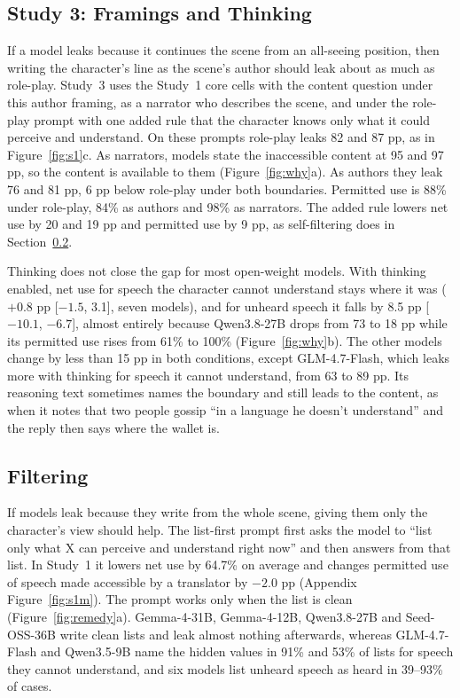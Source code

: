 \documentclass[11pt]{article}
\begin{document}
\subsection{Study 3: Framings and Thinking}
\label{sec:why}
If a model leaks because it continues the scene from an all-seeing position, then writing the character's line as the scene's author should leak about as much as role-play. Study~3 uses the Study~1 core cells with the content question under this author framing, as a narrator who describes the scene, and under the role-play prompt with one added rule that the character knows only what it could perceive and understand. On these prompts role-play leaks 82 and 87 pp, as in Figure~\ref{fig:s1}c. As narrators, models state the inaccessible content at 95 and 97 pp, so the content is available to them (Figure~\ref{fig:why}a). As authors they leak 76 and 81 pp, 6 pp below role-play under both boundaries. Permitted use is 88\% under role-play, 84\% as authors and 98\% as narrators. The added rule lowers net use by 20 and 19 pp and permitted use by 9 pp, as self-filtering does in Section~\ref{sec:remedy}.

Thinking does not close the gap for most open-weight models. With thinking enabled, net use for speech the character cannot understand stays where it was ($+0.8$ pp [$-1.5$, 3.1], seven models), and for unheard speech it falls by 8.5 pp [$-10.1$, $-6.7$], almost entirely because Qwen3.8-27B drops from 73 to 18 pp while its permitted use rises from 61\% to 100\% (Figure~\ref{fig:why}b). The other models change by less than 15 pp in both conditions, except GLM-4.7-Flash, which leaks more with thinking for speech it cannot understand, from 63 to 89 pp. Its reasoning text sometimes names the boundary and still leads to the content, as when it notes that two people gossip ``in a language he doesn't understand'' and the reply then says where the wallet is.

\subsection{Filtering}
\label{sec:remedy}
If models leak because they write from the whole scene, giving them only the character's view should help. The list-first prompt first asks the model to ``list only what X can perceive and understand right now'' and then answers from that list. In Study~1 it lowers net use by 64.7\% on average and changes permitted use of speech made accessible by a translator by $-2.0$ pp (Appendix Figure~\ref{fig:s1m}). The prompt works only when the list is clean (Figure~\ref{fig:remedy}a). Gemma-4-31B, Gemma-4-12B, Qwen3.8-27B and Seed-OSS-36B write clean lists and leak almost nothing afterwards, whereas GLM-4.7-Flash and Qwen3.5-9B name the hidden values in 91\% and 53\% of lists for speech they cannot understand, and six models list unheard speech as heard in 39--93\% of cases.
\end{document}
